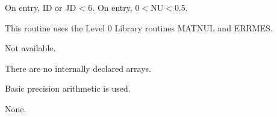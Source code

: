 \begin{indicators}
 On entry, ID or JD < 6.
 On entry, 0${{<}}$NU${{<}}$0.5.
\end{indicators}
\begin{routines}
This routine uses the Level 0 Library routines MATNUL and ERRMES.
\end{routines}
\begin{timing}
Not available.
\end{timing}
\begin{storage}
There are no internally declared arrays.
\end{storage}
\begin{accuracy}
{{Basic precision}} arithmetic is used.
\end{accuracy}
\begin{comments}
None.
\end{comments}


